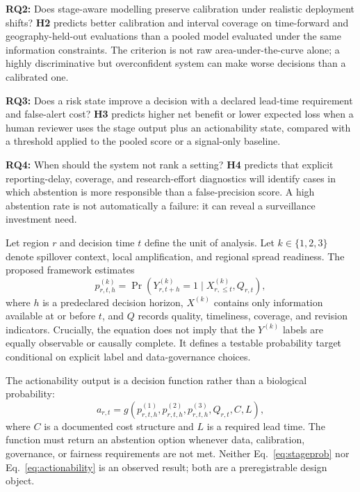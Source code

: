 \documentclass[conference]{IEEEtran}
\begin{document}
\textbf{RQ2:} Does stage-aware modelling preserve calibration under realistic deployment shifts? \textbf{H2} predicts better calibration and interval coverage on time-forward and geography-held-out evaluations than a pooled model evaluated under the same information constraints. The criterion is not raw area-under-the-curve alone; a highly discriminative but overconfident system can make worse decisions than a calibrated one.

\textbf{RQ3:} Does a risk state improve a decision with a declared lead-time requirement and false-alert cost? \textbf{H3} predicts higher net benefit or lower expected loss when a human reviewer uses the stage output plus an actionability state, compared with a threshold applied to the pooled score or a signal-only baseline.

\textbf{RQ4:} When should the system not rank a setting? \textbf{H4} predicts that explicit reporting-delay, coverage, and research-effort diagnostics will identify cases in which abstention is more responsible than a false-precision score. A high abstention rate is not automatically a failure: it can reveal a surveillance investment need.

Let region $r$ and decision time $t$ define the unit of analysis. Let $k \in \{1,2,3\}$ denote spillover context, local amplification, and regional spread readiness. The proposed framework estimates
\begin{equation}
p^{(k)}_{r,t,h}=\Pr\left(Y^{(k)}_{r,t+h}=1\mid X^{(k)}_{r,\leq t},Q_{r,t}\right),
\label{eq:stageprob}
\end{equation}
where $h$ is a predeclared decision horizon, $X^{(k)}$ contains only information available at or before $t$, and $Q$ records quality, timeliness, coverage, and revision indicators. Crucially, the equation does not imply that the $Y^{(k)}$ labels are equally observable or causally complete. It defines a testable probability target conditional on explicit label and data-governance choices.

The actionability output is a decision function rather than a biological probability:
\begin{equation}
a_{r,t}=g\left(p^{(1)}_{r,t,h},p^{(2)}_{r,t,h},p^{(3)}_{r,t,h},Q_{r,t},C,L\right),
\label{eq:actionability}
\end{equation}
where $C$ is a documented cost structure and $L$ is a required lead time. The function must return an abstention option whenever data, calibration, governance, or fairness requirements are not met. Neither Eq.~\eqref{eq:stageprob} nor Eq.~\eqref{eq:actionability} is an observed result; both are a preregistrable design object.
\end{document}
